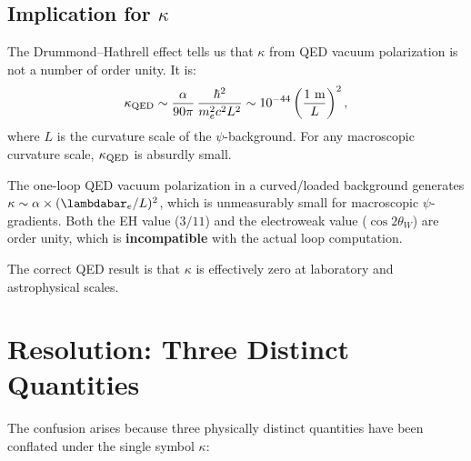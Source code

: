 \documentclass[11pt,a4paper]{article}
\begin{document}
\subsection{Implication for $\kappa$}

The Drummond--Hathrell effect tells us that $\kappa$ from QED vacuum
polarization is not a number of order unity.  It is:
\begin{equation}\label{eq:kappa-QED}
\kappa_{\rm QED} \sim \frac{\alpha}{90\pi}\,\frac{\hbar^2}{m_e^2 c^2 L^2}
\sim 10^{-44}\left(\frac{1~\text{m}}{L}\right)^2,
\end{equation}
where $L$ is the curvature scale of the $\psi$-background.  For any
macroscopic curvature scale, $\kappa_{\rm QED}$ is absurdly small.

\begin{tcolorbox}[colback=green!5!white, colframe=green!60!black,
title=Key Point 2: QED Predicts $\kappa \approx 0$]
The one-loop QED vacuum polarization in a curved/loaded background
generates $\kappa \sim \alpha \times (\lambdabar_e/L)^2$, which is
unmeasurably small for macroscopic $\psi$-gradients.  Both the EH value
($3/11$) and the electroweak value ($\cos 2\theta_W$) are order unity,
which is \textbf{incompatible} with the actual loop computation.

The correct QED result is that $\kappa$ is effectively zero at
laboratory and astrophysical scales.
\end{tcolorbox}

\section{Resolution: Three Distinct Quantities}
\label{sec:resolution}

The confusion arises because three physically distinct quantities have
been conflated under the single symbol $\kappa$:
\end{document}
